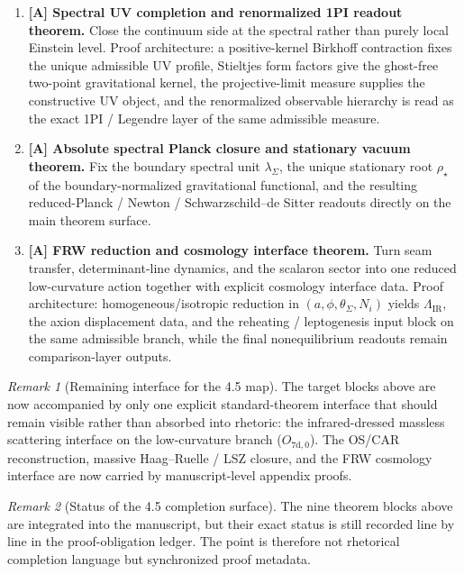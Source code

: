 \documentclass[11pt,a4paper]{article}
\theoremstyle{definition}
\theoremstyle{remark}
\newtheorem*{remark}{Remark}
\begin{document}
\begin{tcolorbox}[colback=tfptblue!2, colframe=tfptblue!40, breakable,
    title={Version 4.5 completion surface}, colbacktitle=tfptblue!60]
\begin{enumerate}[leftmargin=1.5em, topsep=3pt, itemsep=4pt]
    \item \textbf{[A] Spectral UV completion and renormalized 1PI readout theorem.} Close the continuum side at the spectral rather than purely local Einstein level. Proof architecture: a positive-kernel Birkhoff contraction fixes the unique admissible UV profile, Stieltjes form factors give the ghost-free two-point gravitational kernel, the projective-limit measure supplies the constructive UV object, and the renormalized observable hierarchy is read as the exact 1PI / Legendre layer of the same admissible measure.
    \item \textbf{[A] Absolute spectral Planck closure and stationary vacuum theorem.} Fix the boundary spectral unit $\lambda_\Sigma$, the unique stationary root $\rho_\star$ of the boundary-normalized gravitational functional, and the resulting reduced-Planck / Newton / Schwarzschild--de Sitter readouts directly on the main theorem surface.
    \item \textbf{[A] FRW reduction and cosmology interface theorem.} Turn seam transfer, determinant-line dynamics, and the scalaron sector into one reduced low-curvature action together with explicit cosmology interface data. Proof architecture: homogeneous/isotropic reduction in $(a,\phi,\theta_\Sigma,N_i)$ yields $\Lambda_{\mathrm{IR}}$, the axion displacement data, and the reheating / leptogenesis input block on the same admissible branch, while the final nonequilibrium readouts remain comparison-layer outputs.
\end{enumerate}
\end{tcolorbox}

\begin{remark}[Remaining interface for the 4.5 map]
The target blocks above are now accompanied by only one explicit standard-theorem interface that
should remain visible rather than absorbed into rhetoric: the infrared-dressed massless scattering
interface on the low-curvature branch ($O_{7\mathrm{d,0}}$). The OS/CAR reconstruction, massive
Haag--Ruelle / LSZ closure, and the FRW cosmology interface are now carried by manuscript-level
appendix proofs.
\end{remark}

\begin{remark}[Status of the 4.5 completion surface]
The nine theorem blocks above are integrated into the manuscript, but their exact status is still
recorded line by line in the proof-obligation ledger. The point is therefore not rhetorical
completion language but synchronized proof metadata.
\end{remark}
\end{document}
